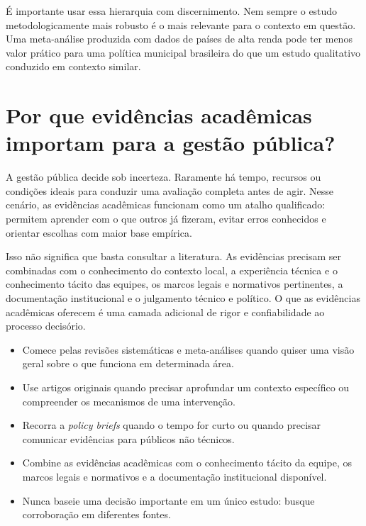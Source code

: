 \documentclass[12pt, a4paper, openany]{book}
\begin{document}
É importante usar essa hierarquia com discernimento. Nem sempre o estudo
metodologicamente mais robusto é o mais relevante para o contexto em questão.
Uma meta-análise produzida com dados de países de alta renda pode ter menos
valor prático para uma política municipal brasileira do que um estudo
qualitativo conduzido em contexto similar.

\section{Por que evidências acadêmicas importam para a gestão pública?}

A gestão pública decide sob incerteza. Raramente há tempo, recursos ou
condições ideais para conduzir uma avaliação completa antes de agir. Nesse
cenário, as evidências acadêmicas funcionam como um atalho qualificado:
permitem aprender com o que outros já fizeram, evitar erros conhecidos e
orientar escolhas com maior base empírica.

Isso não significa que basta consultar a literatura. As evidências precisam
ser combinadas com o conhecimento do contexto local, a experiência técnica e
o conhecimento tácito das equipes, os marcos legais e normativos pertinentes,
a documentação institucional e o julgamento técnico e político. O que as
evidências acadêmicas oferecem é uma camada adicional de rigor e
confiabilidade ao processo decisório.

\begin{notabox}
\begin{itemize}[leftmargin=*]
  \item Comece pelas revisões sistemáticas e meta-análises quando quiser uma
    visão geral sobre o que funciona em determinada área.
  \item Use artigos originais quando precisar aprofundar um contexto
    específico ou compreender os mecanismos de uma intervenção.
  \item Recorra a \textit{policy briefs} quando o tempo for curto ou quando
    precisar comunicar evidências para públicos não técnicos.
  \item Combine as evidências acadêmicas com o conhecimento tácito da equipe,
    os marcos legais e normativos e a documentação institucional disponível.
  \item Nunca baseie uma decisão importante em um único estudo: busque
    corroboração em diferentes fontes.
\end{itemize}
\end{notabox}
\end{document}
